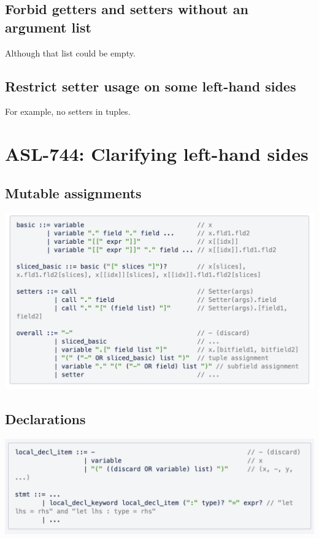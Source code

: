 \subsection{Forbid getters and setters without an argument list}

Although that list could be empty.

\subsection{Restrict setter usage on some left-hand sides}

For example, no setters in tuples.

\section{ASL-744: Clarifying left-hand sides}

\subsection{Mutable assignments}

\includegraphics[width=\textwidth]{lhs-multiple.png}

\subsection{Declarations}

\includegraphics[width=\textwidth]{lhs-declarations.png}

